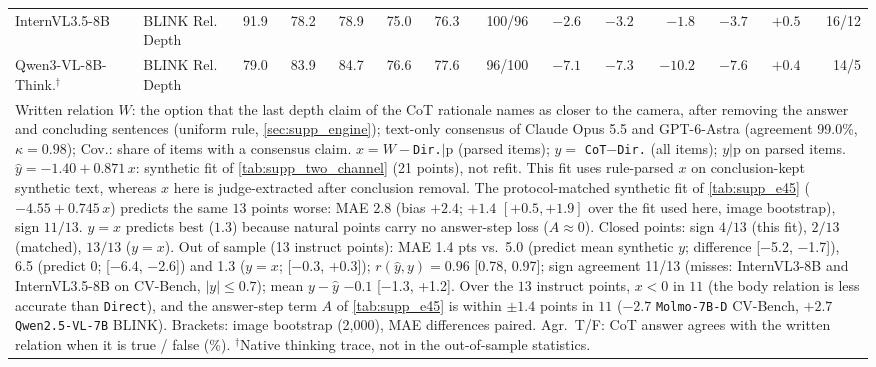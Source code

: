 \begin{tabular}{llrrrrrrrrrrrr}
InternVL3.5-8B & BLINK Rel. Depth & 91.9 & 78.2 & 78.9 & 75.0 & 76.3 & 100/96 & $-2.6$ & $-3.2$ & $-1.8$ & $-3.7$ & $+0.5$ & 16/12 \\
Qwen3-VL-8B-Think.$^\dagger$ & BLINK Rel. Depth & 79.0 & 83.9 & 84.7 & 76.6 & 77.6 & 96/100 & $-7.1$ & $-7.3$ & $-10.2$ & $-7.6$ & $+0.4$ & 14/5 \\
\bottomrule
\multicolumn{14}{p{0.97\linewidth}}{\scriptsize Written relation $W$: the option that the last depth claim of the CoT rationale names as closer to the camera, after removing the answer and concluding sentences (uniform rule, \cref{sec:supp_engine}); text-only consensus of Claude Opus 5.5 and GPT-6-Astra (agreement 99.0\%, $\kappa=0.98$); Cov.: share of items with a consensus claim. $x = W - $\texttt{Dir.}$|$p (parsed items); $y=$ \texttt{CoT}$-$\texttt{Dir.} (all items); $y|$p on parsed items. $\hat y = -1.40 + 0.871\,x$: synthetic fit of \cref{tab:supp_two_channel} (21 points), not refit. This fit uses rule-parsed $x$ on conclusion-kept synthetic text, whereas $x$ here is judge-extracted after conclusion removal. The protocol-matched synthetic fit of \cref{tab:supp_e45} ($-4.55+0.745\,x$) predicts the same $13$ points worse: MAE $2.8$ (bias $+2.4$; $+1.4$ $[+0.5, +1.9]$ over the fit used here, image bootstrap), sign $11/13$. $y=x$ predicts best ($1.3$) because natural points carry no answer-step loss ($A\approx0$). Closed points: sign $4/13$ (this fit), $2/13$ (matched), $13/13$ ($y=x$). Out of sample (13 instruct points): MAE 1.4 pts vs.\ 5.0 (predict mean synthetic $y$; difference [$-$5.2, $-$1.7]), 6.5 (predict 0; [$-$6.4, $-$2.6]) and 1.3 ($y=x$; [$-$0.3, +0.3]); $r(\hat y, y) = 0.96$ [0.78, 0.97]; sign agreement 11/13 (misses: InternVL3-8B and InternVL3.5-8B on CV-Bench, $|y| \le 0.7$); mean $y-\hat y$ $-0.1$ [$-$1.3, +1.2]. Over the $13$ instruct points, $x<0$ in $11$ (the body relation is less accurate than \texttt{Direct}), and the answer-step term $A$ of \cref{tab:supp_e45} is within $\pm1.4$ points in $11$ ($-2.7$ \texttt{Molmo-7B-D} CV-Bench, $+2.7$ \texttt{Qwen2.5-VL-7B} BLINK). Brackets: image bootstrap (2,000), MAE differences paired. Agr.\ T/F: CoT answer agrees with the written relation when it is true / false (\%). $^\dagger$Native thinking trace, not in the out-of-sample statistics.} \\
\end{tabular}
